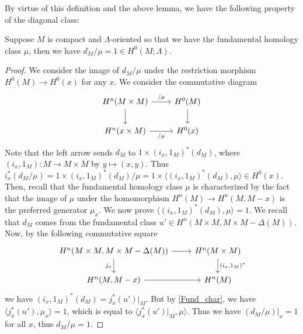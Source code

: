 	By virtue of this definition and the above lemma, we have the following property of the diagonal class: 
	\begin{prop}
		Suppose $M$ is compact and $\Lambda$-oriented so that we have the fundamental homology class $\mu$, then we have $d_M/\mu=1\in H^0(M;\Lambda)$. 
	\end{prop}
	\begin{proof}
		We consider the image of $d_M/\mu$ under the restriction morphism $H^0(M)\to H^0(x)$ for any $x$. We consider the commutative diagram %
		\[\begin{tikzcd}
			{H^n(M\times M)} & {H^0(M)} \\
			{H^n(x\times M)} & {H^0(x)}
			\arrow["{/\mu}", from=1-1, to=1-2]
			\arrow[from=1-1, to=2-1]
			\arrow["{/\mu}"', from=2-1, to=2-2]
			\arrow[from=1-2, to=2-2]
		\end{tikzcd}\]
		Note that the left arrow sends $d_M$ to $1\times(i_x,1_M)^*(d_M)$, where $(i_x,1_M):M\to M\times M$ by $y\mapsto(x,y)$. Thus $i_x^*(d_M/\mu)=1\times(i_x,1_M)^*(d_M)/\mu=1\times\langle(i_x,1_M)^*(d_M),\mu\rangle\in H^0(x)$. \\
		Then, recall that the fundamental homology class $\mu$ is characterized by the fact that the image of $\mu$ under the homomorphism $H^n(M)\to H^n(M,M-x)$ is the preferred generator $\mu_x$. We now prove $\langle(i_x,1_M)^*(d_M),\mu\rangle=1$. We recall that $d_M$ comes from the fundamental class $u'\in H^n(M\times M,M\times M-\Delta(M))$. Now, by the following commutative square 
		\[\begin{tikzcd}
			{H^n(M\times M,M\times M-\Delta(M))} & {H^n(M\times M)} \\
			{H^n(M,M-x)} & {H^n(M)}
			\arrow[from=1-1, to=1-2]
			\arrow["{j_x}"', from=1-1, to=2-1]
			\arrow[from=2-1, to=2-2]
			\arrow["{(i_x,1_M)^*}", from=1-2, to=2-2]
		\end{tikzcd}\]
		we have $(i_x,1_M)^*(d_M)=j_x^*(u')|_M$. But by \cref{Fund_char}, we have $\langle j_x^*(u'),\mu_x\rangle=1$, which is equal to $\langle j_x^*(u')|_M,\mu\rangle$. Thus we have $(d_M/\mu)|_x=1$ for all $x$, thus $d_M/\mu=1$. 
	\end{proof}

